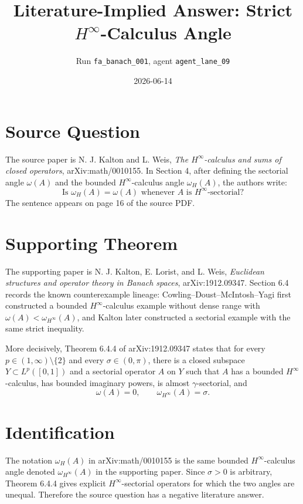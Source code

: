 \documentclass[11pt]{article}
\title{Literature-Implied Answer: Strict \(H^\infty\)-Calculus Angle}
\author{Run \texttt{fa\_banach\_001}, agent \texttt{agent\_lane\_09}}
\date{2026-06-14}
\begin{document}
\maketitle

\section*{Source Question}

The source paper is N. J. Kalton and L. Weis, \emph{The \(H^\infty\)-calculus
and sums of closed operators}, arXiv:math/0010155.  In Section 4, after defining
the sectorial angle \(\omega(A)\) and the bounded \(H^\infty\)-calculus angle
\(\omega_H(A)\), the authors write:
\[
  \text{Is } \omega_H(A)=\omega(A) \text{ whenever } A
  \text{ is } H^\infty\text{-sectorial?}
\]
The sentence appears on page 16 of the source PDF.

\section*{Supporting Theorem}

The supporting paper is N. J. Kalton, E. Lorist, and L. Weis, \emph{Euclidean
structures and operator theory in Banach spaces}, arXiv:1912.09347.  Section
6.4 records the known counterexample lineage: Cowling--Doust--McIntosh--Yagi
first constructed a bounded \(H^\infty\)-calculus example without dense range
with \(\omega(A)<\omega_{H^\infty}(A)\), and Kalton later constructed a
sectorial example with the same strict inequality.

More decisively, Theorem 6.4.4 of arXiv:1912.09347 states that for every
\(p\in(1,\infty)\setminus\{2\}\) and every \(\sigma\in(0,\pi)\), there is a
closed subspace \(Y\subset L^p([0,1])\) and a sectorial operator \(A\) on \(Y\)
such that \(A\) has a bounded \(H^\infty\)-calculus, has bounded imaginary
powers, is almost \(\gamma\)-sectorial, and
\[
  \omega(A)=0,
  \qquad
  \omega_{H^\infty}(A)=\sigma .
\]

\section*{Identification}

The notation \(\omega_H(A)\) in arXiv:math/0010155 is the same bounded
\(H^\infty\)-calculus angle denoted \(\omega_{H^\infty}(A)\) in the supporting
paper.  Since \(\sigma>0\) is arbitrary, Theorem 6.4.4 gives explicit
\(H^\infty\)-sectorial operators for which the two angles are unequal.
Therefore the source question has a negative literature answer.
\end{document}
